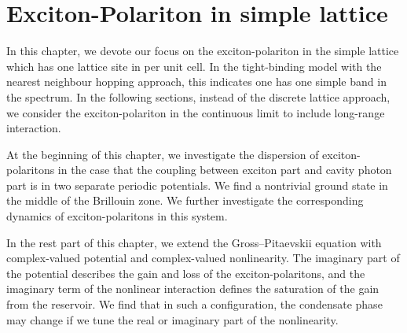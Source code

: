 \chapter{Exciton-Polariton in simple lattice}\label{CHTWO}
In this chapter, we devote our focus on the exciton-polariton in the simple lattice which has one lattice site in per unit cell.
In the tight-binding model with the nearest neighbour hopping approach, this indicates one has one simple band in the spectrum.
In the following sections, instead of the discrete lattice approach, we consider the exciton-polariton in the continuous limit to include long-range interaction.

At the beginning of this chapter, we investigate the dispersion of exciton-polaritons in the case that the coupling between exciton part and cavity photon part is in two separate periodic potentials.
We find a nontrivial ground state in the middle of the Brillouin zone. We further investigate the corresponding dynamics of exciton-polaritons in this system.

In the rest part of this chapter, we extend the Gross--Pitaevskii equation with complex-valued potential and complex-valued nonlinearity.
The imaginary part of the potential describes the gain and loss of the exciton-polaritons, and the imaginary term of the nonlinear interaction defines the saturation of the gain from the reservoir.
We find that in such a configuration, the condensate phase may change if we tune the real or imaginary part of the nonlinearity.

